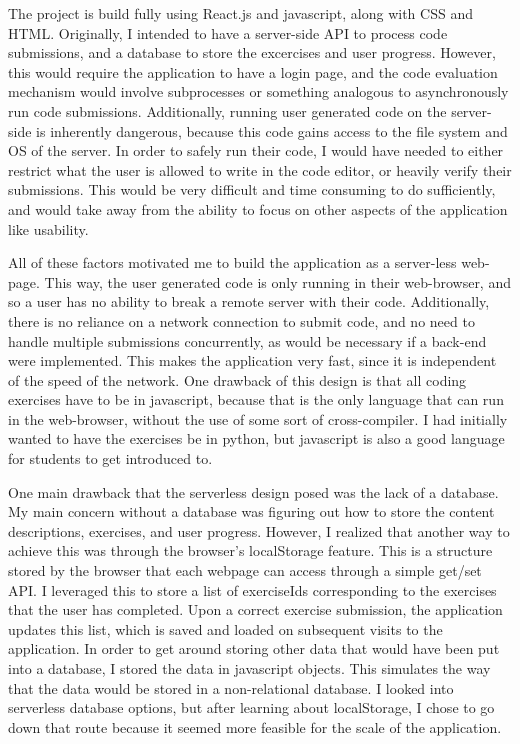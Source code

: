 \documentclass[10pt,twocolumn]{article}
\begin{document}
The project is build fully using React.js and javascript, along with CSS and HTML. Originally, I intended to have a server-side 
API to process code submissions, and a database to store the excercises and user progress. However, this 
would require the application to have a login page, and the code evaluation mechanism would involve subprocesses or something 
analogous to asynchronously run code submissions. Additionally, running user generated code on the server-side 
is inherently dangerous, because this code gains access to the file system and OS of the server. In order to safely run their code,
I would have needed to either restrict what the user is allowed to write in the code editor, or heavily verify their submissions. 
This would be very difficult and time consuming to do sufficiently, and would take away from the ability to focus on other aspects 
of the application like usability. 

All of these factors motivated me to build the application as a server-less web-page. This way, the user generated 
code is only running in their web-browser, and so a user has no ability to break a remote server with their code. Additionally, 
there is no reliance on a network connection to submit code, and no need to handle multiple submissions 
concurrently, as would be necessary if a back-end were implemented. This makes the application very fast, since it is 
independent of the speed of the network. One drawback of this design is that all coding exercises have to be in javascript, 
because that is the only language that can run in the web-browser, without the use of some sort of cross-compiler. I had 
initially wanted to have the exercises be in python, but javascript 
is also a good language for students to get introduced to. 

One main drawback that the serverless design posed was the lack of a database. My main concern without a database was figuring
out how to store the content descriptions, exercises, and user progress. However, I realized that another 
way to achieve this was through the browser's localStorage feature. This is a structure stored by the 
browser that each webpage can access through a simple get/set API. I leveraged this to store a list of exerciseIds corresponding 
to the exercises that the user has completed. Upon a correct exercise submission, the application updates this list, which is 
saved and loaded on subsequent visits to the application. In order to get around storing other data that would have been put 
into a database, I stored the data in javascript objects. This simulates the way that the data would be stored in a non-relational
database. I looked into serverless database options, but after learning about localStorage, I chose to go 
down that route because it seemed more feasible for the scale of the application. 
\end{document}
